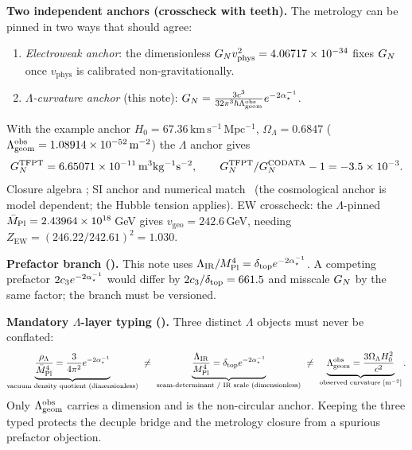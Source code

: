 \noindent\textbf{Two independent anchors (crosscheck with teeth).} The metrology can be pinned in
two ways that should agree:
\begin{enumerate}
\item \emph{Electroweak anchor}: the dimensionless $G_N v_{\mathrm{phys}}^2=4.06717\times10^{-34}$
fixes $G_N$ once $v_{\mathrm{phys}}$ is calibrated non-gravitationally.
\item \emph{$\Lambda$-curvature anchor} (this note): $G_N=\tfrac{3c^3}{32\pi^3\hbar\Lambda_{\mathrm{geom}}^{\mathrm{obs}}}e^{-2\alpha^{-1}_\star}$.
\end{enumerate}
With the example anchor $H_0=67.36\,\mathrm{km\,s^{-1}\,Mpc^{-1}}$, $\Omega_\Lambda=0.6847$
($\Lambda_{\mathrm{geom}}^{\mathrm{obs}}=1.08914\times10^{-52}\,\mathrm{m^{-2}}$) the $\Lambda$ anchor gives
\begin{equation}
  G_N^{\mathrm{TFPT}}=6.65071\times10^{-11}\,\mathrm{m^3kg^{-1}s^{-2}},\qquad
  G_N^{\mathrm{TFPT}}/G_N^{\mathrm{CODATA}}-1=-3.5\times10^{-3}.
\end{equation}
Closure algebra \mE; SI anchor and numerical match \mC\ (the cosmological anchor is model dependent;
the Hubble tension applies). EW crosscheck: the $\Lambda$-pinned $\bar M_{\mathrm{Pl}}=2.43964\times10^{18}\,$GeV
gives $v_{\mathrm{geo}}=242.6\,$GeV, needing $Z_{\mathrm{EW}}=(246.22/242.61)^2=1.030$.

\par\smallskip\noindent\textbf{Prefactor branch (\mO).}
This note uses $\Lambda_{\mathrm{IR}}/M_{\mathrm{Pl}}^4=\delta_{\mathrm{top}} e^{-2\alpha^{-1}_\star}$. A competing prefactor $2c_3 e^{-2\alpha^{-1}_\star}$ would
differ by $2c_3/\delta_{\mathrm{top}}=661.5$ and misscale $G_N$ by the same factor; the branch must be versioned.
\par\smallskip

\par\smallskip\noindent\textbf{Mandatory $\Lambda$-layer typing (\mO).}
Three distinct $\Lambda$ objects must never be conflated:
\[
  \underbrace{\frac{\rho_\Lambda}{\bar M_{\mathrm{Pl}}^4}=\frac{3}{4\pi^2}e^{-2\alpha^{-1}_\star}}_{\text{vacuum density quotient (dimensionless)}}
  \ \neq\
  \underbrace{\frac{\Lambda_{\mathrm{IR}}}{M_{\mathrm{Pl}}^4}=\delta_{\mathrm{top}} e^{-2\alpha^{-1}_\star}}_{\text{seam-determinant / IR scale (dimensionless)}}
  \ \neq\
  \underbrace{\Lambda_{\mathrm{geom}}^{\mathrm{obs}}=\frac{3\Omega_\Lambda H_0^2}{c^2}}_{\text{observed curvature }[\mathrm{m}^{-2}]} .
\]
Only $\Lambda_{\mathrm{geom}}^{\mathrm{obs}}$ carries a dimension and is the non-circular anchor. Keeping the three
typed protects the decuple bridge and the metrology closure from a spurious prefactor objection.
\par\smallskip

